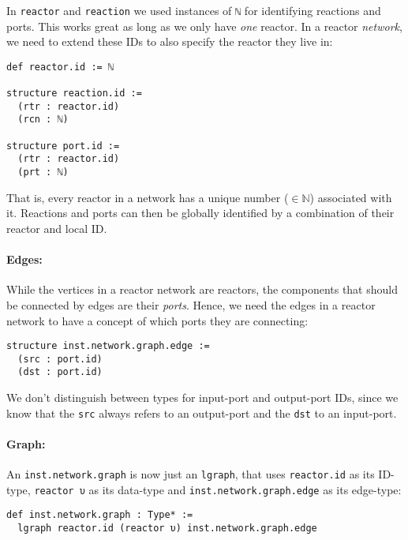 In \lstinline{reactor} and \lstinline{reaction} we used instances of \lstinline{ℕ} for identifying reactions and ports.
This works great as long as we only have \emph{one} reactor.
In a reactor \emph{network}, we need to extend these IDs to also specify the reactor they live in:

\begin{lstlisting}
def reactor.id := ℕ

structure reaction.id := 
  (rtr : reactor.id) 
  (rcn : ℕ)

structure port.id := 
  (rtr : reactor.id) 
  (prt : ℕ)
\end{lstlisting}

\noindent That is, every reactor in a network has a unique number ($\in \mathbb{N}$) associated with it.
Reactions and ports can then be globally identified by a combination of their reactor and local ID.

\paragraph{Edges:}

While the vertices in a reactor network are reactors, the components that should be connected by edges are their \emph{ports}.
Hence, we need the edges in a reactor network to have a concept of which ports they are connecting:

\begin{lstlisting}
structure inst.network.graph.edge :=
  (src : port.id)
  (dst : port.id)
\end{lstlisting}

\noindent We don't distinguish between types for input-port and output-port IDs, since we know that the \lstinline{src} always refers to an output-port and the \lstinline{dst} to an input-port.

\paragraph{Graph:}

An \lstinline{inst.network.graph} is now just an \lstinline{lgraph}, that uses \lstinline{reactor.id} as its ID-type, \lstinline{reactor υ} as its data-type and \lstinline{inst.network.graph.edge} as its edge-type:

\begin{lstlisting}
def inst.network.graph : Type* := 
  lgraph reactor.id (reactor υ) inst.network.graph.edge
\end{lstlisting}

